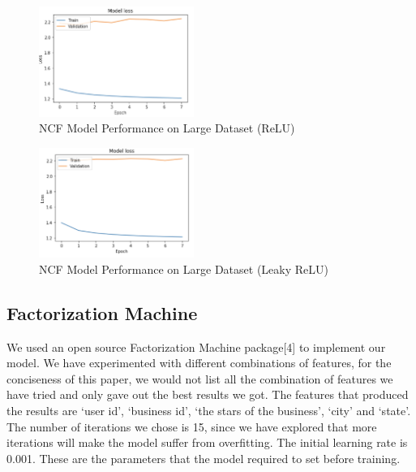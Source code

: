 \documentclass[journal]{IEEEtran}
\begin{document}
\begin{figure}
\begin {center}
\includegraphics[width=0.45\textwidth]{images/relu.png}
\caption{NCF Model Performance on Large Dataset (ReLU)}
\label{fig:l_d_ncf_relu}
\end {center}
\end{figure}

\begin{figure}
\begin {center}
\includegraphics[width=0.45\textwidth]{images/leaky_relu.png}
\caption{NCF Model Performance on Large Dataset (Leaky ReLU)}
\label{fig:l_d_ncf_leaky}
\end {center}
\end{figure}


\subsection{Factorization Machine}
We used an open source Factorization Machine package[4] to implement our model. We have experimented with different combinations of features, for the conciseness of this paper, we would not list all the combination of features we have tried and only gave out the best results we got. The features that produced the results are `user id', `business id', `the stars of the business', `city' and `state'.
The number of iterations we chose is 15, since we have explored that more iterations will make the model suffer from overfitting. The initial learning rate is 0.001. These are the parameters that the model required to set before training. 
\end{document}
